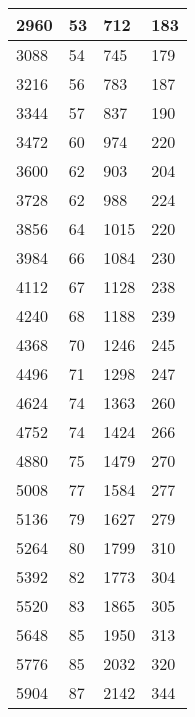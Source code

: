 \begin{longtable}{|l|l|l|l|}
		2960  & 53          & 712             & 183              \\ \hline
		3088  & 54          & 745             & 179              \\ \hline
		3216  & 56          & 783             & 187              \\ \hline
		3344  & 57          & 837             & 190              \\ \hline
		3472  & 60          & 974             & 220              \\ \hline
		3600  & 62          & 903             & 204              \\ \hline
		3728  & 62          & 988             & 224              \\ \hline
		3856  & 64          & 1015            & 220              \\ \hline
		3984  & 66          & 1084            & 230              \\ \hline
		4112  & 67          & 1128            & 238              \\ \hline
		4240  & 68          & 1188            & 239              \\ \hline
		4368  & 70          & 1246            & 245              \\ \hline
		4496  & 71          & 1298            & 247              \\ \hline
		4624  & 74          & 1363            & 260              \\ \hline
		4752  & 74          & 1424            & 266              \\ \hline
		4880  & 75          & 1479            & 270              \\ \hline
		5008  & 77          & 1584            & 277              \\ \hline
		5136  & 79          & 1627            & 279              \\ \hline
		5264  & 80          & 1799            & 310              \\ \hline
		5392  & 82          & 1773            & 304              \\ \hline
		5520  & 83          & 1865            & 305              \\ \hline
		5648  & 85          & 1950            & 313              \\ \hline
		5776  & 85          & 2032            & 320              \\ \hline
		5904  & 87          & 2142            & 344              \\ \hline

\end{longtable}
